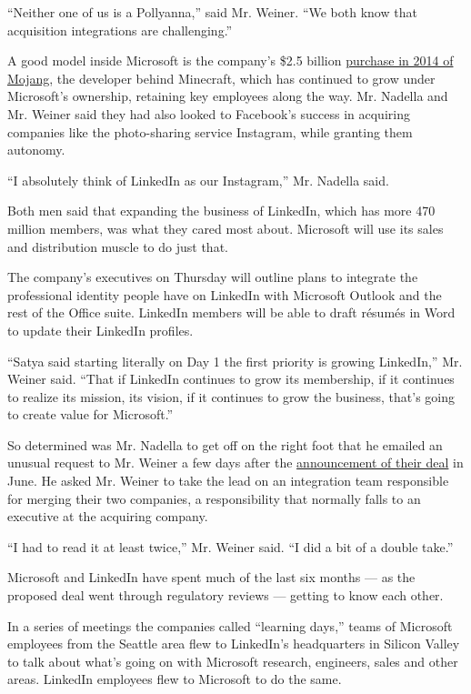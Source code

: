``Neither one of us is a Pollyanna,'' said Mr. Weiner. ``We both know
that acquisition integrations are challenging.''

A good model inside Microsoft is the company's \$2.5 billion
\href{http://dealbook.nytimes3xbfgragh.onion/2014/09/15/microsoft-to-buy-creator-of-minecraft-for-2-5-billion/}{purchase
in 2014 of Mojang}, the developer behind Minecraft, which has continued
to grow under Microsoft's ownership, retaining key employees along the
way. Mr. Nadella and Mr. Weiner said they had also looked to Facebook's
success in acquiring companies like the photo-sharing service Instagram,
while granting them autonomy.

``I absolutely think of LinkedIn as our Instagram,'' Mr. Nadella said.

Both men said that expanding the business of LinkedIn, which has more
470 million members, was what they cared most about. Microsoft will use
its sales and distribution muscle to do just that.

The company's executives on Thursday will outline plans to integrate the
professional identity people have on LinkedIn with Microsoft Outlook and
the rest of the Office suite. LinkedIn members will be able to draft
résumés in Word to update their LinkedIn profiles.

``Satya said starting literally on Day 1 the first priority is growing
LinkedIn,'' Mr. Weiner said. ``That if LinkedIn continues to grow its
membership, if it continues to realize its mission, its vision, if it
continues to grow the business, that's going to create value for
Microsoft.''

So determined was Mr. Nadella to get off on the right foot that he
emailed an unusual request to Mr. Weiner a few days after the
\href{http://www.nytimes3xbfgragh.onion/2016/06/14/business/dealbook/microsoft-to-buy-linkedin-for-26-2-billion.html}{announcement
of their deal} in June. He asked Mr. Weiner to take the lead on an
integration team responsible for merging their two companies, a
responsibility that normally falls to an executive at the acquiring
company.

``I had to read it at least twice,'' Mr. Weiner said. ``I did a bit of a
double take.''

Microsoft and LinkedIn have spent much of the last six months --- as the
proposed deal went through regulatory reviews --- getting to know each
other.

In a series of meetings the companies called ``learning days,'' teams of
Microsoft employees from the Seattle area flew to LinkedIn's
headquarters in Silicon Valley to talk about what's going on with
Microsoft research, engineers, sales and other areas. LinkedIn employees
flew to Microsoft to do the same.

